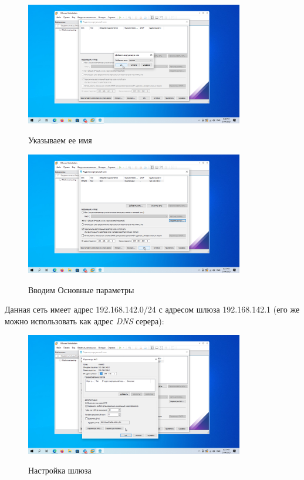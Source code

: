\documentclass[a4paper]{article}
\begin{document}
  \begin{figure}[H]
    \centering
    \includegraphics[width=0.85\textwidth]{5_0004}
    \label{img:4}
    \caption{Указываем ее имя}
  \end{figure}

  \begin{figure}[H]
    \centering
    \includegraphics[width=0.85\textwidth]{5_0005}
    \label{img:5}
    \caption{Вводим Основные параметры}
  \end{figure}

  Данная сеть имеет адрес 192.168.142.0/24 с адресом шлюза 192.168.142.1 (его
  же можно использовать как адрес \textit{DNS} серера):

  \begin{figure}[H]
    \centering
    \includegraphics[width=0.85\textwidth]{5_0006}
    \label{img:6}
    \caption{Настройка шлюза}
  \end{figure}
\end{document}
